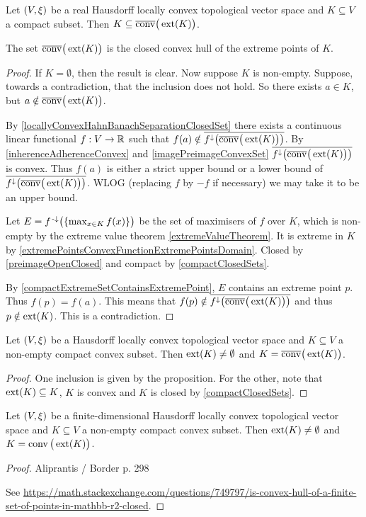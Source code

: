 \begin{proposition}
Let $\sSet{V,\xi}$ be a real Hausdorff locally convex topological vector space and $K\subseteq V$ a compact subset. Then $K\subseteq \overline{\operatorname{conv}}\big(\operatorname{ext}(K)\big)$.
\end{proposition}
The set $\overline{\operatorname{conv}}\big(\operatorname{ext}(K)\big)$ is the closed convex hull of the extreme points of $K$.
\begin{proof}
If $K = \emptyset$, then the result is clear. Now suppose $K$ is non-empty. Suppose, towards a contradiction, that the inclusion does not hold. So there exists $a\in K$, but $a\notin \overline{\operatorname{conv}}\big(\operatorname{ext}(K)\big)$.

By \ref{locallyConvexHahnBanachSeparationClosedSet} there exists a continuous linear functional $f: V\to \mathbb{R}$ such that $f(a) \notin \overline{f^\downarrow\big(\overline{\operatorname{conv}}\big(\operatorname{ext}(K)\big)\big)}$. By \ref{inherenceAdherenceConvex} and \ref{imagePreimageConvexSet} $\overline{f^\downarrow\big(\overline{\operatorname{conv}}\big(\operatorname{ext}(K)\big)\big)}$ is convex. Thus $f(a)$ is either a strict upper bound or a lower bound of $\overline{f^\downarrow\big(\overline{\operatorname{conv}}\big(\operatorname{ext}(K)\big)\big)}$. WLOG (replacing $f$ by $-f$ if necessary) we may take it to be an upper bound.

Let $E = f^{{\text{\hspace{0.15em}-}\downarrow}}\big(\{\max_{x\in K} f(x)\}\big)$ be the set of maximisers of $f$ over $K$, which is non-empty by the extreme value theorem \ref{extremeValueTheorem}. It is extreme in $K$ by \ref{extremePointsConvexFunctionExtremePointsDomain}. Closed by \ref{preimageOpenClosed} and compact by \ref{compactClosedSets}.

By \ref{compactExtremeSetContainsExtremePoint}, $E$ contains an extreme point $p$. Thus $f(p) = f(a)$. This means that $f(p) \notin \overline{f^\downarrow\big(\overline{\operatorname{conv}}\big(\operatorname{ext}(K)\big)\big)}$ and thus $p \notin \operatorname{ext}(K)$. This is a contradiction.
\end{proof}
\begin{corollary}
Let $\sSet{V,\xi}$ be a Hausdorff locally convex topological vector space and $K\subseteq V$ a non-empty compact convex subset. Then $\operatorname{ext}(K)\neq \emptyset$ and $K = \overline{\operatorname{conv}}\big(\operatorname{ext}(K)\big)$.
\end{corollary}
\begin{proof}
One inclusion is given by the proposition. For the other, note that $\operatorname{ext}(K) \subseteq K$, $K$ is convex and $K$ is closed by \ref{compactClosedSets}.
\end{proof}

\begin{proposition}
Let $\sSet{V,\xi}$ be a finite-dimensional Hausdorff locally convex topological vector space and $K\subseteq V$ a non-empty compact convex subset. Then $\operatorname{ext}(K)\neq \emptyset$ and $K = \operatorname{conv}\big(\operatorname{ext}(K)\big)$.
\end{proposition}
\begin{proof}
Aliprantis / Border p. 298

See \url{https://math.stackexchange.com/questions/749797/is-convex-hull-of-a-finite-set-of-points-in-mathbb-r2-closed}.
\end{proof}


